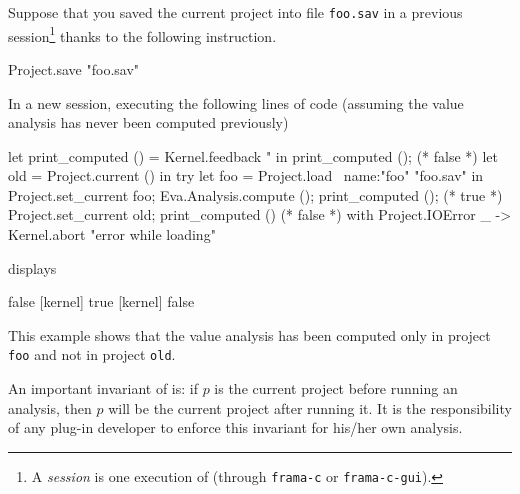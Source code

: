 \begin{example}\label{ex:set_current}
  Suppose that you saved the current project into file
  \texttt{foo.sav} in a previous \framac session\footnote{A
    \emph{session} is one execution of \framac (through \texttt{frama-c} or
    \texttt{frama-c-gui}).} thanks to the following
  instruction.
\begin{ocamlcode}
Project.save "foo.sav"
\end{ocamlcode}
In a new \framac session, executing the following lines of code (assuming the
value analysis has never been computed previously)
\begin{ocamlcode}
let print_computed () =
  Kernel.feedback "%
in
print_computed ();   (* false *)
let old = Project.current () in
try
  let foo = Project.load ~name:"foo" "foo.sav" in
  Project.set_current foo;
  Eva.Analysis.compute ();
  print_computed ();   (* true *)
  Project.set_current old;
  print_computed ()    (* false *)
with Project.IOError _ ->
  Kernel.abort "error while loading"
\end{ocamlcode}
displays
\begin{shell}
[kernel] false
[kernel] true
[kernel] false
\end{shell}
This example shows that the value analysis has been computed only in project
\texttt{foo} and not in project \texttt{old}.
\end{example}

\begin{important}
An important invariant of \framac is: if $p$ is the current project before
running an analysis, then $p$ will be the current project after running it. It
is the responsibility of any plug-in developer to enforce this invariant for
his/her own analysis.
\end{important}

